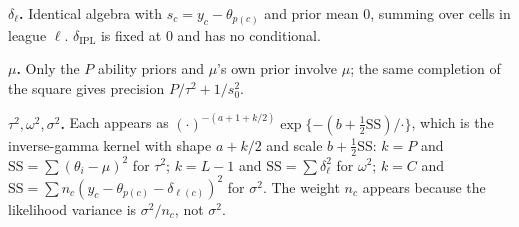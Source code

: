 \documentclass[11pt,a4paper]{article}
\begin{document}
\textbf{$\delta_\ell$.} Identical algebra with $s_c = y_c - \theta_{p(c)}$ and prior mean 0,
summing over cells in league $\ell$. $\delta_{\mathrm{IPL}}$ is fixed at 0 and has no
conditional.

\textbf{$\mu$.} Only the $P$ ability priors and $\mu$'s own prior involve $\mu$; the same
completion of the square gives precision $P/\tau^2 + 1/s_0^2$.

\textbf{$\tau^2, \omega^2, \sigma^2$.} Each appears as $(\cdot)^{-(a+1+k/2)}\exp\{-(b + \frac{1}{2}
\mathrm{SS})/\cdot\}$, which is the inverse-gamma kernel with shape $a + k/2$ and scale
$b + \frac{1}{2}\mathrm{SS}$: $k=P$ and $\mathrm{SS}=\sum(\theta_i-\mu)^2$ for $\tau^2$;
$k=L-1$ and $\mathrm{SS}=\sum \delta_\ell^2$ for $\omega^2$; $k=C$ and
$\mathrm{SS}=\sum n_c(y_c-\theta_{p(c)}-\delta_{\ell(c)})^2$ for $\sigma^2$. The weight $n_c$
appears because the likelihood variance is $\sigma^2/n_c$, not $\sigma^2$.
\end{document}
